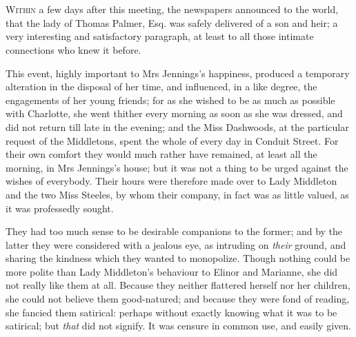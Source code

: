 \chapter[Chapter \thechapter]{}
\lettrine[lraise=0.3]{W}{ithin} a few days after this meeting, the newspapers announced to the world, that the lady of Thomas Palmer, Esq. was safely delivered of a son and heir; a very interesting and satisfactory paragraph, at least to all those intimate connections who knew it before.

This event, highly important to Mrs Jennings's happiness, produced a temporary alteration in the disposal of her time, and influenced, in a like degree, the engagements of her young friends; for as she wished to be as much as possible with Charlotte, she went thither every morning as soon as she was dressed, and did not return till late in the evening; and the Miss Dashwoods, at the particular request of the Middletons, spent the whole of every day in Conduit Street. For their own comfort they would much rather have remained, at least all the morning, in Mrs Jennings's house; but it was not a thing to be urged against the wishes of everybody. Their hours were therefore made over to Lady Middleton and the two Miss Steeles, by whom their company, in fact was as little valued, as it was professedly sought.

They had too much sense to be desirable companions to the former; and by the latter they were considered with a jealous eye, as intruding on \textit{their} ground, and sharing the kindness which they wanted to monopolize. Though nothing could be more polite than Lady Middleton's behaviour to Elinor and Marianne, she did not really like them at all. Because they neither flattered herself nor her children, she could not believe them good-natured; and because they were fond of reading, she fancied them satirical: perhaps without exactly knowing what it was to be satirical; but \textit{that} did not signify. It was censure in common use, and easily given.

